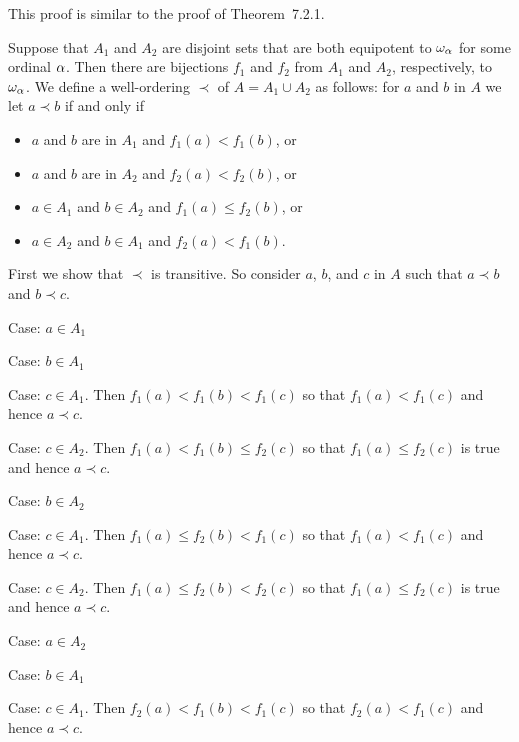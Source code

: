 \begin{solution}
    \mainprob

    This proof is similar to the proof of Theorem~7.2.1.

	Suppose that $A_1$ and $A_2$ are disjoint sets that are both equipotent to $\omega_\alpha$ for some ordinal $\alpha$.
    Then there are bijections $f_1$ and $f_2$ from $A_1$ and $A_2$, respectively, to $\omega_\alpha$.
    We define a well-ordering $\prec$ of $A = A_1 \cup A_2$ as follows: for $a$ and $b$ in $A$ we let $a \prec b$ if and only if
    \begin{itemize}
        \item $a$ and $b$ are in $A_1$ and $f_1(a) < f_1(b)$, or
        \item $a$ and $b$ are in $A_2$ and $f_2(a) < f_2(b)$, or
        \item $a \in A_1$ and $b \in A_2$ and $f_1(a) \leq f_2(b)$, or
        \item $a \in A_2$ and $b \in A_1$ and $f_2(a) < f_1(b)$.
    \end{itemize}

    First we show that $\prec$ is transitive.
    So consider $a$, $b$, and $c$ in $A$ such that $a \prec b$ and $b \prec c$.

    Case: $a \in A_1$
    \begin{indpar}
        Case: $b \in A_1$
        \begin{indpar}
            Case: $c \in A_1$.
            Then $f_1(a) < f_1(b) < f_1(c)$ so that $f_1(a) < f_1(c)$ and hence $a \prec c$.

            Case: $c \in A_2$.
            Then $f_1(a) < f_1(b) \leq f_2(c)$ so that $f_1(a) \leq f_2(c)$ is true and hence $a \prec c$.
        \end{indpar}

        Case: $b \in A_2$
        \begin{indpar}
            Case: $c \in A_1$.
            Then $f_1(a) \leq f_2(b) < f_1(c)$ so that $f_1(a) < f_1(c)$ and hence $a \prec c$.

            Case: $c \in A_2$.
            Then $f_1(a) \leq f_2(b) < f_2(c)$ so that $f_1(a) \leq f_2(c)$ is true and hence $a \prec c$.
        \end{indpar}
    \end{indpar}

    Case: $a \in A_2$
    \begin{indpar}
        Case: $b \in A_1$
        \begin{indpar}
            Case: $c \in A_1$.
            Then $f_2(a) < f_1(b) < f_1(c)$ so that $f_2(a) < f_1(c)$ and hence $a \prec c$.


\end{indpar}
\end{indpar}
\end{solution}
